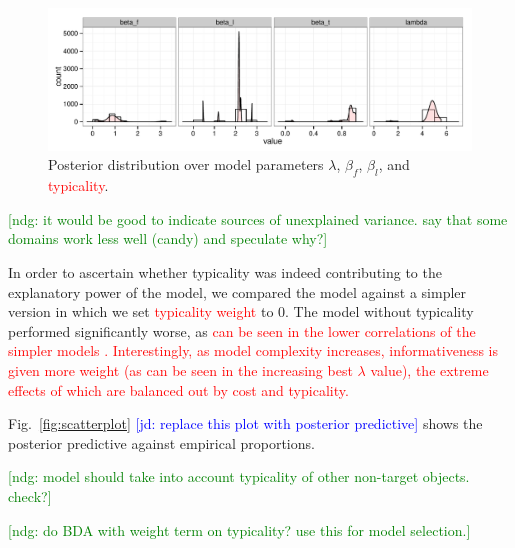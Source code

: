 \documentclass[10pt,letterpaper]{article}
\newcommand{\jd}[1]{\textcolor{Blue}{[jd: #1]}}
\newcommand{\red}[1]{\textcolor{Red}{#1}}
\newcommand{\ndg}[1]{\textcolor{Green}{[ndg: #1]}}
\newcommand{\tableref}[1]{Table \ref{#1}}
\newcommand{\figref}[1]{Fig.~\ref{#1}}
\begin{document}
\begin{figure}
\includegraphics[width=\textwidth]{graphs/parameterposteriors.pdf}
\caption{Posterior distribution over model parameters $\lambda$, $\beta_f$, $\beta_l$, and \red{typicality}.}
\label{fig:paramposteriors}
\end{figure}


\ndg{it would be good to indicate sources of unexplained variance. say that some domains work less well (candy) and speculate why?}

In order to ascertain whether typicality was indeed contributing to the explanatory power of the model, we compared the model against a simpler version in which we set \red{typicality weight} to 0. %
The model without typicality performed significantly worse, as \red{can be seen in the lower correlations of the simpler models .
Interestingly, as model complexity increases, informativeness is given more weight (as can be seen in the increasing best $\lambda$ value), the extreme effects of which are balanced out by cost and typicality.}

\figref{fig:scatterplot} \jd{replace this plot with posterior predictive} shows the posterior predictive against empirical proportions.%

\ndg{model should take into account typicality of other non-target objects. check?}

\ndg{do BDA with weight term on typicality? use this for model selection.}
\end{document}
